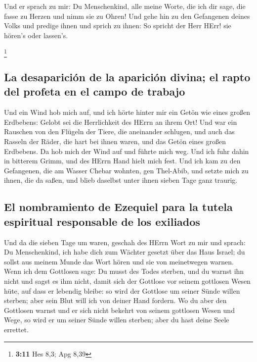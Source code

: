  Und er sprach zu mir: Du Menschenkind, alle meine Worte,
die ich dir sage, die fasse zu Herzen und nimm sie zu Ohren!
 Und gehe hin zu den Gefangenen deines Volks und predige
ihnen und sprich zu ihnen: So spricht der Herr HErr! sie hören's oder
lassen's.

\footnote{\textbf{3:11} Hes 8,3; Apg 8,39}

\hypertarget{la-desapariciuxf3n-de-la-apariciuxf3n-divina-el-rapto-del-profeta-en-el-campo-de-trabajo}{%
\subsection{La desaparición de la aparición divina; el rapto del profeta
en el campo de
trabajo}\label{la-desapariciuxf3n-de-la-apariciuxf3n-divina-el-rapto-del-profeta-en-el-campo-de-trabajo}}

 Und ein Wind hob mich auf, und ich hörte hinter mir ein
Getön wie eines großen Erdbebens: Gelobt sei die Herrlichkeit des HErrn
an ihrem Ort!  Und war ein Rauschen von den Flügeln der
Tiere, die aneinander schlugen, und auch das Rasseln der Räder, die hart
bei ihnen waren, und das Getön eines großen Erdbebens. 
Da hob mich der Wind auf und führte mich weg. Und ich fuhr dahin in
bitterem Grimm, und des HErrn Hand hielt mich fest.  Und
ich kam zu den Gefangenen, die am Wasser Chebar wohnten, gen Thel-Abib,
und setzte mich zu ihnen, die da saßen, und blieb daselbst unter ihnen
sieben Tage ganz traurig.

\hypertarget{el-nombramiento-de-ezequiel-para-la-tutela-espiritual-responsable-de-los-exiliados}{%
\subsection{El nombramiento de Ezequiel para la tutela espiritual
responsable de los
exiliados}\label{el-nombramiento-de-ezequiel-para-la-tutela-espiritual-responsable-de-los-exiliados}}

 Und da die sieben Tage um waren, geschah des HErrn Wort
zu mir und sprach:  Du Menschenkind, ich habe dich zum
Wächter gesetzt über das Haus Israel; du sollst aus meinem Munde das
Wort hören und sie von meinetwegen warnen.  Wenn ich dem
Gottlosen sage: Du musst des Todes sterben, und du warnst ihn nicht und
sagst es ihm nicht, damit sich der Gottlose vor seinem gottlosen Wesen
hüte, auf dass er lebendig bleibe: so wird der Gottlose um seiner Sünde
willen sterben; aber sein Blut will ich von deiner Hand fordern.
 Wo du aber den Gottlosen warnst und er sich nicht
bekehrt von seinem gottlosen Wesen und Wege, so wird er um seiner Sünde
willen sterben; aber du hast deine Seele errettet.

